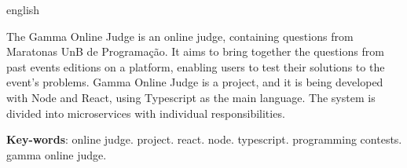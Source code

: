 \begin{resumo}[Abstract]
 \begin{otherlanguage*}{english}
 
   The Gamma Online Judge is an online judge, containing questions from Maratonas UnB de Programação. It aims to bring together the questions from past events editions on a platform, enabling users to test their solutions to the event's problems. Gamma Online Judge is a project, and it is being developed with Node and React, using Typescript as the main language. The system is divided into microservices with individual responsibilities.

   \vspace{\onelineskip}
 
   \noindent 
   \textbf{Key-words}: online judge. project. react. node. typescript. programming contests. gamma online judge.
   
 \end{otherlanguage*}
\end{resumo}

